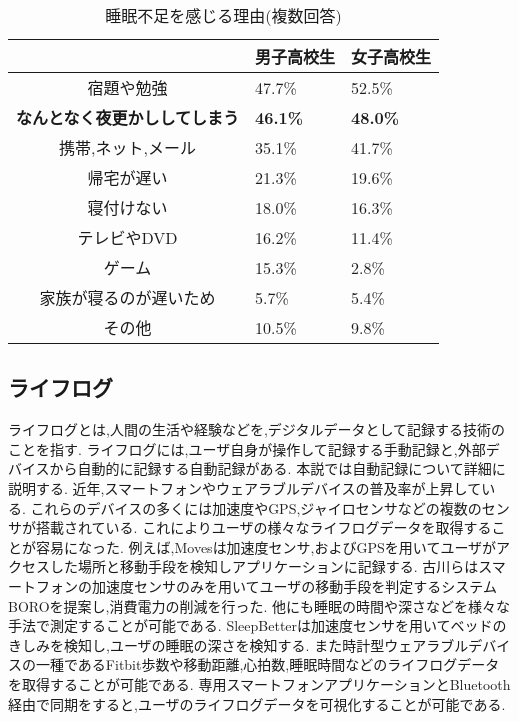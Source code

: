 \begin{table}[htbp]
	\begin{center}
		\caption{睡眠不足を感じる理由(複数回答)}
		\label{reason}
		\begin{tabular}{|c|ll|}
		\hline
		 & 男子高校生 & 女子高校生\\
		\hline \hline
		宿題や勉強 & 47.7\% & 52.5\% \\
		\bfseries{なんとなく夜更かししてしまう} & \bfseries{46.1\%} & \bfseries{48.0\%} \\
		携帯,ネット,メール & 35.1\% & 41.7\% \\
		帰宅が遅い & 21.3\% & 19.6\% \\
		寝付けない & 18.0\% & 16.3\% \\
		テレビやDVD & 16.2\% & 11.4\% \\
		ゲーム & 15.3\% & 2.8\% \\
		家族が寝るのが遅いため & 5.7\% & 5.4\% \\
		その他 & 10.5\% & 9.8\% \\
		\hline
		\end{tabular}
	\end{center}
\end{table}

\newpage
\subsection{ライフログ}
ライフログとは,人間の生活や経験などを,デジタルデータとして記録する技術のことを指す.
ライフログには,ユーザ自身が操作して記録する手動記録と,外部デバイスから自動的に記録する自動記録がある.
本説では自動記録について詳細に説明する.
近年,スマートフォンやウェアラブルデバイス\cite{Fuelband}\cite{AndroidWear}の普及率が上昇している.
これらのデバイスの多くには加速度やGPS,ジャイロセンサなどの複数のセンサが搭載されている.
これによりユーザの様々なライフログデータを取得することが容易になった.
例えば,Moves\cite{Moves}は加速度センサ,およびGPSを用いてユーザがアクセスした場所と移動手段を検知しアプリケーションに記録する.
古川らはスマートフォンの加速度センサのみを用いてユーザの移動手段を判定するシステムBORO\cite{Boro}を提案し,消費電力の削減を行った.
他にも睡眠の時間や深さなどを様々な手法で測定することが可能である.
SleepBetterは加速度センサを用いてベッドのきしみを検知し,ユーザの睡眠の深さを検知する.
また時計型ウェアラブルデバイスの一種であるFitbit歩数や移動距離,心拍数,睡眠時間などのライフログデータを取得することが可能である.
専用スマートフォンアプリケーションとBluetooth経由で同期をすると,ユーザのライフログデータを可視化することが可能である.

